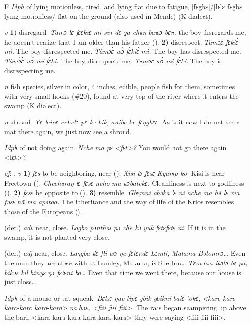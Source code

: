 \begin{letter}{F}
 \textit{Idph} of lying motionless, tired, and lying flat due to fatigue, [fɛgbɛ]/[lɛlɛ fɛgbɛ] lying motionless/ flat on the ground (also used in Mende) (K dialect).

 \textit{v} \textbf{1)} disregard. \textit{Tamɔ lɛ fɛɛkiɛ mi sin dɛ ya chaŋ bawɔ bɛn.} the boy disregards me, he doesn't realize that I am older than his father (\citealt{Pichl1967}). \textbf{2)} disrespect. \textit{Tamɔɛ fɛkiɛ́ mì.} The boy disrespected me. \textit{Tàmɔ̀ɛ̀ wɔ̀ fɛ̀kiɛ́ mì.} The boy has disrespected me. \textit{Tàmɔ̀ɛ̀ wɔ́ mí fɛ̀kí.} The boy disrespects me. \textit{Tamɔɛ wɔ̀ mí fɛ̀kí.} The boy is disrespecting me. 

 \textit{n} fish species, silver in color, 4 inches, edible, people fish for them, sometimes with very small hooks (\#20), found at very top of the river where it enters the swamp (K dialect).

 \textit{n} shroud. \textit{Yɛ laioɛ achelɔ pɛ ke bik, anibo ke fɛŋgbɛɛ.} As is it now I do not see a mat there again, we just now see a shroud.

 \textit{Idph} of not doing again. \textit{Nche ma pɛ <fɛt>?} You would not go there again <fɛt>?

 \textit{cf}: . \textit{v} \textbf{1)} \textit{fɛs} to be neighboring, near (\citealt{Pichl1967}). \textit{Kisi lɔ fɛsɛ Kyamp ko.} Kisi is near Freetown (\citealt{Pichl1967}). \textit{Checharaŋ lɛ fɛsɛ ncho ma hɔbatokɛ.} Cleanliness is next to godliness (\citealt{Pichl1967}). \textbf{2)} \textit{fɛsɛ} be opposite to (\citealt{Sumner1921}). \textbf{3)} resemble. \textit{Gbe̹mni abəka lɛ ni nche ma hã lɛ ma fəsɛ hã ma apotoa.} The inheritance and the way of life of the Krios resembles those of the Europeans (\citealt{Pichl1967}). 

 (der.) \textit{adv} near, close. \textit{Lagbo pɔnthai pɔ che kɔ yuk fɛtɛfɛtɛ ni.} If it is in the swamp, it is not planted very close.

 (der.) \textit{adj} near, close. \textit{Laŋgba dɛ fli wɔ ŋa fɛtɛndɛ Lɔmli, Malama Bolomnɔ…} Even the man they are close with at Lumley, Malama, is Sherbro… \textit{Tɛm lan ikɔlɔ bɛ pa, bikɔs kil hinyɛ ŋɔ fɛtɛni bo…} Even that time we went there, because our house is just close…

 \textit{Idph} of a mouse or rat squeak. \textit{Bɛlsɛ ŋae tipɛ gbik-gbikni baiɛ tokɛ, <kara-kara kara-kara kara-kara> ŋa hɔɛ, <fiii fiii fiii>.} The rats began scampering up above the bari, <kara-kara kara-kara kara-kara> they were saying <fiii fiii fiii>.


\end{letter}
